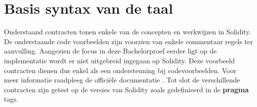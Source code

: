 \setcounter{section}{0}
\section{Basis syntax van de taal}
\label{ch:Voorbeelden van solidity contracten} 
Onderstaand contracten tonen enkele van de concepten en werkwijzen in Solidity. De onderstaande code voorbeelden zijn voorzien van enkele commentaar regels ter aanvulling. Aangezien de focus in deze Bachelorproef eerder ligt op de implementatie wordt er niet uitgebreid ingegaan op Solidity. Deze voorbeeld contracten dienen dus enkel als een ondersteuning bij codevoorbeelden. Voor meer informatie raadpleeg de officiële documentatie \cite{SolidityDocs}. Tot slot de verschillende contracten zijn getest op de versies van Solidity zoals gedefinieerd in de \textbf{pragma} tags.\\

